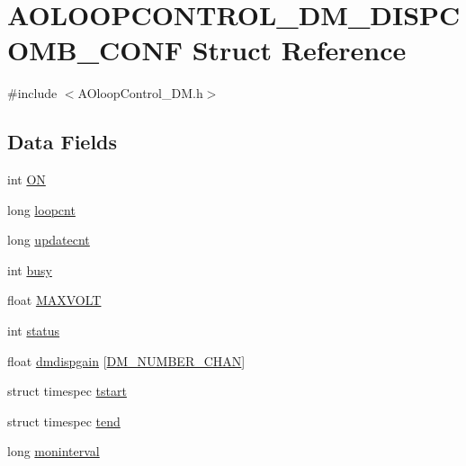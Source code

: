 \hypertarget{structAOLOOPCONTROL__DM__DISPCOMB__CONF}{\section{A\+O\+L\+O\+O\+P\+C\+O\+N\+T\+R\+O\+L\+\_\+\+D\+M\+\_\+\+D\+I\+S\+P\+C\+O\+M\+B\+\_\+\+C\+O\+N\+F Struct Reference}
\label{structAOLOOPCONTROL__DM__DISPCOMB__CONF}
}


{\ttfamily \#include $<$A\+Oloop\+Control\+\_\+\+D\+M.\+h$>$}

\subsection*{Data Fields}
\begin{DoxyCompactItemize}
\item 
int \hyperlink{structAOLOOPCONTROL__DM__DISPCOMB__CONF_aa0df7b4f1998c78e3b160ee62a473d7f}{O\+N}
\item 
long \hyperlink{structAOLOOPCONTROL__DM__DISPCOMB__CONF_a2f048e0388e0d3e1b2f9ad7f3ad7e34f}{loopcnt}
\item 
long \hyperlink{structAOLOOPCONTROL__DM__DISPCOMB__CONF_a0eb7c648b544dbe4e15f5932be0f5043}{updatecnt}
\item 
int \hyperlink{structAOLOOPCONTROL__DM__DISPCOMB__CONF_a00c9df4a16dad4698649e7cc56d99541}{busy}
\item 
float \hyperlink{structAOLOOPCONTROL__DM__DISPCOMB__CONF_aa2720d128f464f809274e76bdbe21cb2}{M\+A\+X\+V\+O\+L\+T}
\item 
int \hyperlink{structAOLOOPCONTROL__DM__DISPCOMB__CONF_a0e19e607cfec7426adb8679d155933f5}{status}
\item 
float \hyperlink{structAOLOOPCONTROL__DM__DISPCOMB__CONF_ad510a455ee216e78323db080641cdf83}{dmdispgain} \mbox{[}\hyperlink{AOloopControl__DM_8h_a27f91dcf4025c354015057c9d860bdd7}{D\+M\+\_\+\+N\+U\+M\+B\+E\+R\+\_\+\+C\+H\+A\+N}\mbox{]}
\item 
struct timespec \hyperlink{structAOLOOPCONTROL__DM__DISPCOMB__CONF_a3be151c816bca61cb3b71ca59a4eb637}{tstart}
\item 
struct timespec \hyperlink{structAOLOOPCONTROL__DM__DISPCOMB__CONF_a5fd9f2a167ca2ba287624ad8d6d28a90}{tend}
\item 
long \hyperlink{structAOLOOPCONTROL__DM__DISPCOMB__CONF_a0e9dd6356232d1f72e5328d758840a1f}{moninterval}
\end{DoxyCompactItemize}



